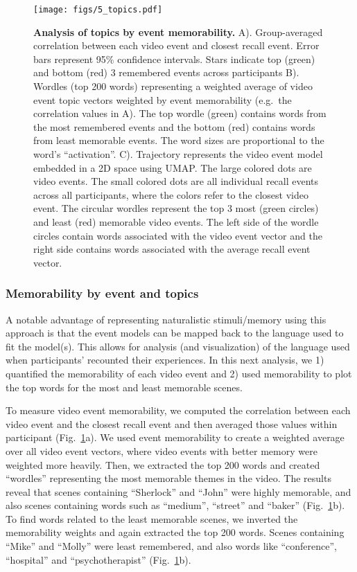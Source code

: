 \documentclass{article}
\begin{document}
\begin{figure}[t!]
\centering
\texttt{[image: figs/5\_topics.pdf]}
\caption{\small \textbf{Analysis of topics by event memorability.} A). Group-averaged correlation between each video event and closest recall event. Error bars represent 95\% confidence intervals. Stars indicate top (green) and bottom (red) 3 remembered events across participants B). Wordles (top 200 words) representing a weighted average of video event topic vectors weighted by event memorability (e.g.\ the correlation values in A). The top wordle (green) contains words from the most remembered events and the bottom (red) contains words from least memorable events. The word sizes are proportional to the word's ``activation''. C). Trajectory represents the video event model embedded in a 2D space using UMAP. The large colored dots are video events. The small colored dots are all individual recall events across all participants, where the colors refer to the closest video event. The circular wordles represent the top 3 most (green circles) and least (red) memorable video events.  The left side of the wordle circles contain words associated with the video event vector and the right side contains words associated with the average recall event vector.}
\label{fig:topics}
\end{figure}

\subsubsection{Memorability by event and topics}
A notable advantage of representing naturalistic stimuli/memory using this approach is that the event models can be mapped back to the language used to fit the model(s).  This allows for analysis (and visualization) of the language used when participants' recounted their experiences.  In this next analysis, we 1) quantified the memorability of each video event and 2) used memorability to plot the top words for the most and least memorable scenes.

To measure video event memorability, we computed the correlation between each video event and the closest recall event and then averaged those values within participant (Fig.~\ref{fig:topics}a). We used event memorability to create a weighted average over all video event vectors, where video events with better memory were weighted more heavily. Then, we extracted the top 200 words and created ``wordles'' representing the most memorable themes in the video. The results reveal that scenes containing ``Sherlock'' and ``John'' were highly memorable, and also scenes containing words such as ``medium'', ``street'' and ``baker'' (Fig.~\ref{fig:topics}b). To find words related to the least memorable scenes, we inverted the memorability weights and again extracted the top 200 words.  Scenes containing ``Mike'' and ``Molly'' were least remembered, and also words like ``conference'', ``hospital'' and ``psychotherapist'' (Fig.~\ref{fig:topics}b).
\end{document}
